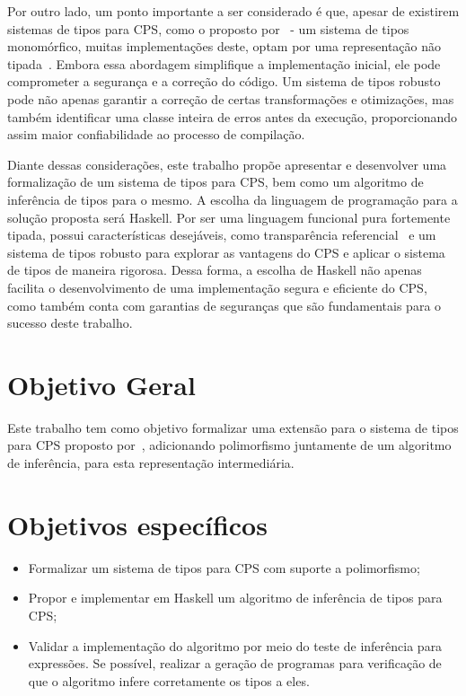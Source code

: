 Por outro lado, um ponto importante a ser considerado é que, apesar de existirem sistemas de tipos para CPS, como o proposto por~ - um sistema de tipos monomórfico, muitas implementações deste, optam por uma representação não tipada~\cite{morrisett1999systemF}.
Embora essa abordagem simplifique a implementação inicial, ele pode comprometer a segurança e a correção do código.
Um sistema de tipos robusto pode não apenas garantir a correção de certas transformações e otimizações, mas também identificar uma classe inteira de erros antes da execução, proporcionando assim maior confiabilidade ao processo de compilação.

Diante dessas considerações, este trabalho propõe apresentar e desenvolver uma formalização de um sistema de tipos para CPS, bem como um algoritmo de inferência de tipos para o mesmo.
A escolha da linguagem de programação para a solução proposta será Haskell.
Por ser uma linguagem funcional pura fortemente tipada, possui características desejáveis, como transparência referencial~\cite{sondergaard1990transparency} e um sistema de tipos robusto para explorar as vantagens do CPS e aplicar o sistema de tipos de maneira rigorosa.
Dessa forma, a escolha de Haskell não apenas facilita o desenvolvimento de uma implementação segura e eficiente do CPS, como também conta com garantias de seguranças que são fundamentais para o sucesso deste trabalho.

\section{Objetivo Geral}\label{sec:objetivo-geral}

Este trabalho tem como objetivo formalizar uma extensão para o sistema de tipos para CPS proposto por~, adicionando polimorfismo juntamente de um algoritmo de inferência, para esta representação intermediária.

\section{Objetivos específicos}\label{sec:objetivos-especificos}

\begin{itemize}
  \item Formalizar um sistema de tipos para CPS com suporte a polimorfismo;\@
  \item Propor e implementar em Haskell um algoritmo de inferência de tipos para CPS;\@
  \item Validar a implementação do algoritmo por meio do teste de inferência para expressões. Se possível, realizar a geração de programas para verificação de que o algoritmo infere corretamente os tipos a eles.
\end{itemize}

